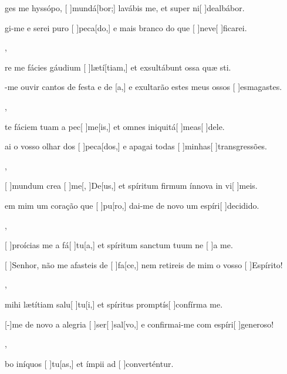 {  {\item {}ges me hyssópo, [ ]{mun}{dá}[bor;] lavábis me, et super ni[ ]{de}{al}{bá}bor.~\Antiphona}%
    {\item {}gi-me e serei puro [ ]{pe}{ca}[do,] e mais branco do que [ ]{ne}{ve}[ ]{fica}rei.~\Antiphona},
  {\item {}re me fácies gáudium [ ]{læ}{tí}[tiam,] et exsultábunt ossa quæ sti.~\Antiphona}%
    {\item {}-me ouvir cantos de festa e de [a,] e exultarão estes meus ossos [ ]{es}{ma}{gas}tes.~\Antiphona},
  {\item {}te fáciem tuam a pec[ ]{me}[is,] et omnes iniquitá[ ]{me}{as}[ ]{de}le.~\Antiphona}%
    {\item {}ai o vosso olhar dos [ ]{pe}{ca}[dos,] e apagai todas [ ]{mi}{nhas}[ ]{transgres}sões.~\Antiphona},
  {\item {}[ ]{mun}dum crea [ ]{me}[, ]{De}[us,] et spíritum firmum ínnova in vi[ ]{me}is.~\Antiphona}%
    {\item {} em mim um coração que [ ]{pu}[ro,] dai-me de novo um espíri[ ]{de}{ci}{di}do.~\Antiphona},
  {\item {}[ ]{pro}ícias me a fá[ ]{tu}[a,] et spíritum sanctum tuum ne [ ]{a} me.~\Antiphona}%
    {\item {}[ ]{Se}nhor, não me afasteis de [ ]{fa}[ce,] nem retireis de mim o vosso [ ]{Es}{píri}to!~\Antiphona},
  {\item {} mihi lætítiam salu[ ]{tu}[i,] et spíritus promptís[ ]{con}{fírma} me.~\Antiphona}%
    {\item {}[-]{me} de novo a alegria [ ]{ser}[ ]{sal}[vo,] e confir\-mai-me com espíri[ ]{ge}{ne}{ro}so!~\Antiphona},
  {\item {}bo iníquos [ ]{tu}[as,] et ímpii ad [ ]{con}{ver}{tén}{\-tur.}~\Antiphona}%
}

